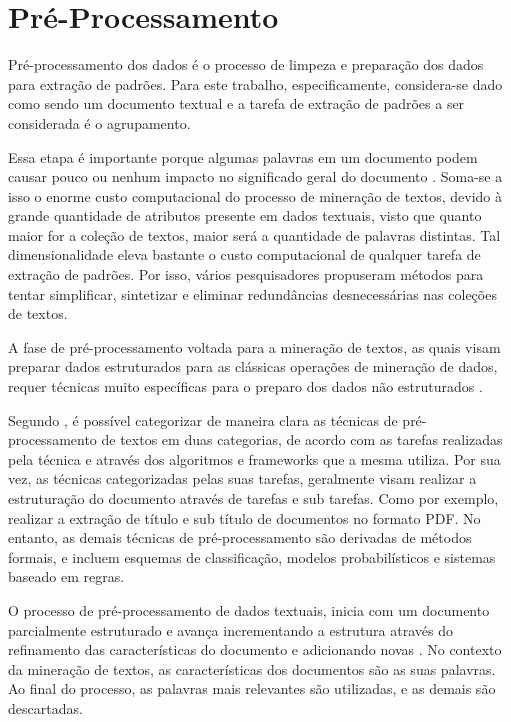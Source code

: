 \section{Pré-Processamento} Pré-processamento dos dados é o processo de limpeza e preparação dos
dados para extração de padrões.  Para este trabalho, especificamente, considera-se dado como sendo
um documento textual e a tarefa de extração de padrões a ser considerada é o agrupamento.

Essa etapa é importante porque algumas palavras em um documento podem causar pouco ou nenhum impacto
no significado geral do documento \cite{Haddi2013}.  Soma-se a isso o enorme custo computacional do
processo de mineração de textos, devido à grande quantidade de atributos presente em dados
textuais, visto que quanto maior for a coleção de textos, maior será a quantidade de palavras
distintas. Tal dimensionalidade eleva bastante o custo computacional de qualquer tarefa de extração
de padrões.  Por isso, vários pesquisadores propuseram métodos para tentar simplificar, sintetizar e
eliminar redundâncias desnecessárias nas coleções de textos.  

A fase de pré-processamento voltada para a mineração de textos, as quais visam preparar dados
estruturados para as clássicas operações de mineração de dados, requer técnicas muito específicas
para o preparo dos dados não estruturados \cite{Feldman2007}.

Segundo , é possível categorizar de maneira clara as técnicas de
pré-processamento de textos em duas categorias, de acordo com as tarefas realizadas pela técnica e
através dos algoritmos e frameworks que a mesma utiliza. Por sua vez, as técnicas categorizadas
pelas suas tarefas, geralmente visam realizar a estruturação do documento através de tarefas e sub
tarefas.  Como por exemplo, realizar a extração de título e sub título de documentos no formato PDF.
No entanto, as demais técnicas de pré-processamento são derivadas de métodos formais, e incluem
esquemas de classificação, modelos probabilísticos e sistemas baseado em regras.

O processo de pré-processamento de dados textuais, inicia com um documento parcialmente estruturado
e avança incrementando a estrutura através do refinamento das características do documento e
adicionando novas \cite{Feldman2007}.  No contexto da mineração de textos, as características dos
documentos são as suas palavras\cite{Haddi2013}. Ao final do processo, as palavras mais relevantes
são utilizadas, e as demais são descartadas.

